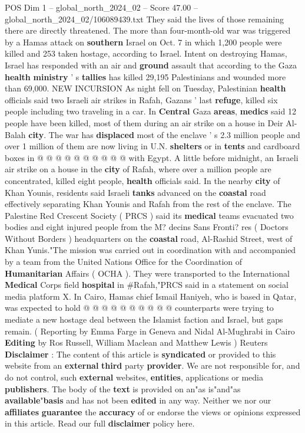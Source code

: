\begin{textsample}{POS Dim 1 – global\_north\_2024\_02 – Score 47.00 – global\_north\_2024\_02/106089439.txt}
They said the lives of those remaining there are directly threatened.
The more than four-month-old war was triggered by a Hamas attack on \textbf{southern} Israel on Oct. 7 in which 1,200 people were killed and 253 taken hostage, according to Israel.
Intent on destroying Hamas, Israel has responded with an air and \textbf{ground} assault that according to the Gaza \textbf{health} \textbf{ministry} ' s \textbf{tallies} has killed 29,195 Palestinians and wounded more than 69,000.
NEW INCURSION As night fell on Tuesday, Palestinian \textbf{health} officials said two Israeli air strikes in Rafah, Gazans ' last \textbf{refuge}, killed six people including two traveling in a car.
In \textbf{Central} Gaza \textbf{areas}, \textbf{medics} said 12 people have been killed, most of them during an air strike on a house in Deir Al-Balah \textbf{city}.
The war has \textbf{displaced} most of the enclave ' s 2.3 million people and over 1 million of them are now living in U.N. \textbf{shelters} or in \textbf{tents} and cardboard boxes in @ @ @ @ @ @ @ @ @ @ with Egypt.
A little before midnight, an Israeli air strike on a house in the \textbf{city} of Rafah, where over a million people are concentrated, killed eight people, \textbf{health} officials said.
In the nearby \textbf{city} of Khan Younis, residents said Israeli \textbf{tanks} advanced on the \textbf{coastal} road effectively separating Khan Younis and Rafah from the rest of the enclave.
The Palestine Red Crescent Society ( PRCS ) said its \textbf{medical} teams evacuated two bodies and eight injured people from the M? decins Sans Fronti? res ( Doctors Without Borders ) headquarters on the \textbf{coastal} road, Al-Rashid Street, west of Khan Yunis."The mission was carried out in coordination with and accompanied by a team from the United Nations Office for the Coordination of \textbf{Humanitarian} Affairs ( OCHA ).
They were transported to the International \textbf{Medical} Corps field \textbf{hospital} in \#Rafah,"PRCS said in a statement on social media platform X.
In Cairo, Hamas chief Ismail Haniyeh, who is based in Qatar, was expected to hold @ @ @ @ @ @ @ @ @ @ counterparts were trying to mediate a new hostage deal between the Islamist faction and Israel, but gaps remain. ( Reporting by Emma Farge in Geneva and Nidal Al-Mughrabi in Cairo \textbf{Editing} by Ros Russell, William Maclean and Matthew Lewis ) Reuters \textbf{Disclaimer} : The content of this article is \textbf{syndicated} or provided to this website from an \textbf{external} \textbf{third} party \textbf{provider}.
We are not responsible for, and do not control, such \textbf{external} websites, \textbf{entities}, applications or media \textbf{publishers}.
The body of the \textbf{text} is provided on an"as is"and"as \textbf{available}"\textbf{basis} and has not been \textbf{edited} in any way.
Neither we nor our \textbf{affiliates} \textbf{guarantee} the \textbf{accuracy} of or endorse the views or opinions expressed in this article.
Read our full \textbf{disclaimer} policy here.


\end{textsample}
